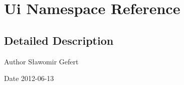 \hypertarget{namespace_ui}{
\section{Ui Namespace Reference}
\label{namespace_ui}
}


\subsection{Detailed Description}
\begin{DoxyAuthor}{Author}
Sławomir Gefert 
\end{DoxyAuthor}
\begin{DoxyDate}{Date}
2012-\/06-\/13 
\end{DoxyDate}
